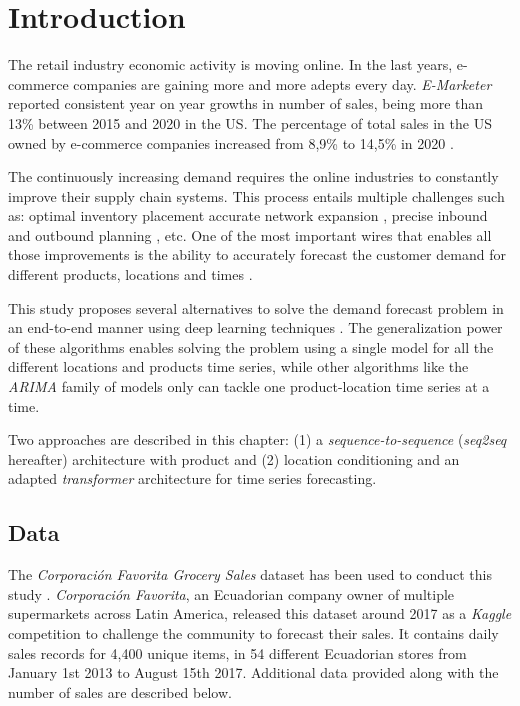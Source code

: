 \section{Introduction}
The retail industry economic activity is moving online. In the last years, e-commerce companies are gaining more and more adepts every day. \textit{E-Marketer} \autocite{emarketer2019, emarketer2020} reported consistent year on year growths in number of sales, being more than 13\% between 2015 and 2020 in the US. The percentage of total sales in the US owned by e-commerce companies increased from 8,9\% to 14,5\% in 2020 \autocite{emarketer2019, emarketer2020}.

The continuously increasing demand requires the online industries to constantly improve their supply chain systems. This process entails multiple challenges such as: optimal inventory placement \autocite{graves2008}accurate network expansion \autocite{hossein2017}, precise inbound and outbound planning \autocite{kaipia2009}, etc. One of the most important wires that enables all those improvements is the ability to accurately forecast the customer demand for different products, locations and times \autocite{forslund2007}.

This study proposes several alternatives to solve the demand forecast problem in an end-to-end manner using deep learning techniques \autocite{Goodfellow2016}. The generalization power of these algorithms enables solving the problem using a single model for all the different locations and products time series, while other algorithms like the \textit{ARIMA} family of models \autocite{Hyndman2018} only can tackle one product-location time series at a time.

Two approaches are described in this chapter: (1) a \textit{sequence-to-sequence} (\textit{seq2seq} hereafter) architecture with product and (2) location conditioning and an adapted \textit{transformer} architecture for time series forecasting.


\subsection{Data} \label{sec:salesforecast_data}
The \textit{Corporación Favorita Grocery Sales} dataset  has been used to conduct this study \autocite{corporacionfavoritadataset2018}. \textit{Corporación Favorita}, an Ecuadorian company owner of multiple supermarkets across Latin America, released this dataset around 2017 as a \textit{Kaggle} competition to challenge the community to forecast their sales. It contains daily sales records for 4,400 unique items, in 54 different Ecuadorian stores from January 1st 2013 to August 15th 2017. Additional data provided along with the number of sales are described below.

